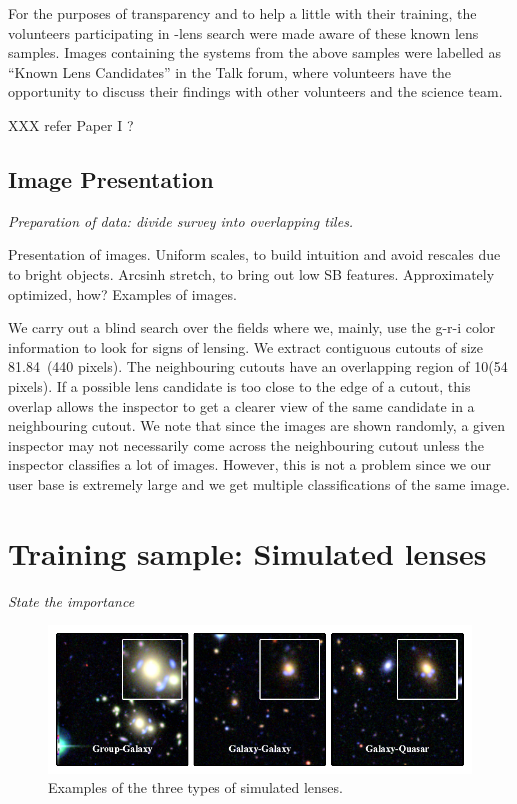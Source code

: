 \documentclass[useAMS,usenatbib,a4paper]{mn2e}
\begin{document}
For the purposes of transparency and to help a little with their training, 
the volunteers participating in \sw-\cfhtls lens search were made aware of
these known lens samples. Images containing the systems from the above samples
were labelled as ``Known Lens Candidates'' in the Talk forum, where volunteers
have the opportunity to discuss their findings with other volunteers and the
science team. 

XXX refer Paper I ?



\subsection{Image Presentation}
\label{sec:data:impres}
{\it Preparation of data: divide survey into overlapping tiles. 

Presentation of images. Uniform scales, to build intuition and avoid rescales
due to bright objects. Arcsinh stretch, to bring out low SB features. 
Approximately optimized, how? Examples of images.}

We carry out a blind search over the \cfhtls fields where we, mainly, use
the g-r-i color information to look for signs of lensing. We extract
contiguous cutouts of size 81.84\arcsec\ (440 pixels). The neighbouring
cutouts have an overlapping region of 10\arcsec (54 pixels). If a
possible lens candidate is too close to the edge of a cutout, this
overlap allows the inspector to get a clearer view of the same candidate
in a neighbouring cutout. We note that since the images are shown
randomly, a given inspector may not necessarily come across the
neighbouring cutout unless the inspector classifies a lot of images.
However, this is not a problem since we our user base is extremely large
and we get multiple classifications of the same image.



\section{Training sample: Simulated lenses}
\label{sec:ts}

{\it State the importance}

\begin{figure}
\begin{center}
\includegraphics[scale=1.0]{sw-cfhtls-figs/sim_cgq.pdf}
\caption{ \label{fig:sim}
Examples of the three types of simulated lenses.
}
\end{center}
\end{figure}
\end{document}
